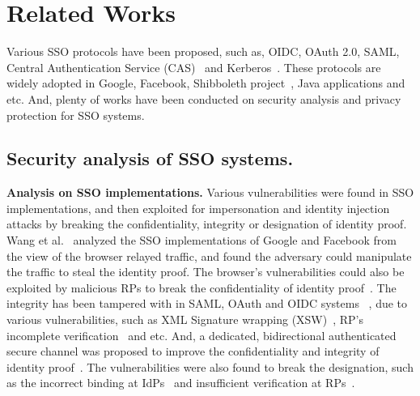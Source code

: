 \section{Related Works}%
\label{sec:related}
Various SSO  protocols have been proposed, such as, OIDC, OAuth 2.0, SAML, Central Authentication Service (CAS)~\cite{aubry2004esup} and Kerberos~\cite{Kerberos}.
These protocols are widely adopted in Google, Facebook, Shibboleth project~\cite{Shibboleth}, Java applications and etc.
And, plenty of works have been conducted on security analysis and privacy protection for SSO systems.

\subsection{Security analysis of SSO systems.}
\noindent\textbf{Analysis on SSO implementations.} Various vulnerabilities were found in SSO implementations, and then exploited for impersonation and identity injection attacks by breaking the confidentiality, integrity or designation of identity proof.
Wang et al.~\cite{WangCW12} analyzed the SSO implementations of Google and Facebook from the view of the browser relayed traffic, and found the adversary could manipulate the traffic to steal the identity proof. The browser's vulnerabilities could also be  exploited by malicious RPs to break the confidentiality of identity proof~\cite{ArmandoCCCPS13}.
The integrity has been tampered with in SAML, OAuth and OIDC systems ~\cite{SomorovskyMSKJ12,WangCW12,ZhouE14,WangZLG16,YangLLZH16,MainkaMS16, MainkaMSW17},
 due to various vulnerabilities, such as  XML Signature wrapping (XSW)~\cite{SomorovskyMSKJ12}, RP's incomplete verification~\cite{ZhouE14,WangZLG16,YangLLZH16} and etc.
And, a dedicated, bidirectional authenticated secure channel was proposed to improve the confidentiality and integrity of identity proof~\cite{CaoSBKVC14}.
The vulnerabilities were also found to break the designation, such as the incorrect binding  at IdPs~\cite{YangLCZ18} and insufficient verification at RPs~\cite{ZhouE14,WangZLG16,YangLLZH16}.




